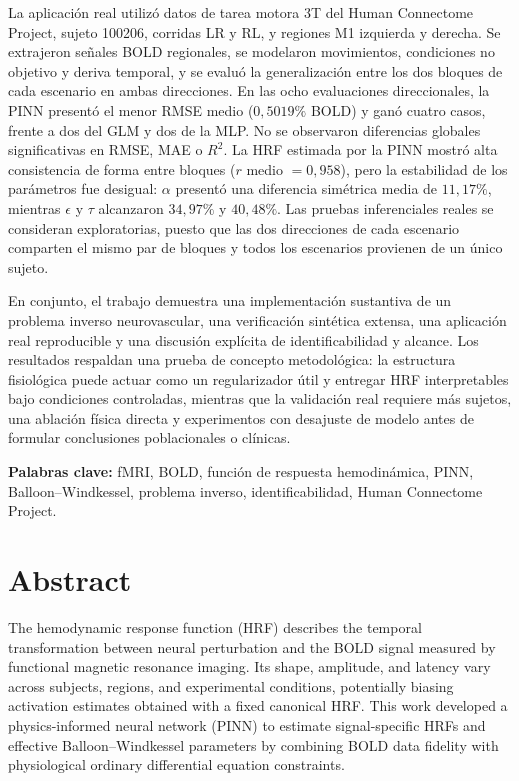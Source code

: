 La aplicación real utilizó datos de tarea motora 3T del Human Connectome Project, sujeto 100206, corridas LR y RL, y regiones M1 izquierda y derecha. Se extrajeron señales BOLD regionales, se modelaron movimientos, condiciones no objetivo y deriva temporal, y se evaluó la generalización entre los dos bloques de cada escenario en ambas direcciones. En las ocho evaluaciones direccionales, la PINN presentó el menor RMSE medio ($0{,}5019\%$ BOLD) y ganó cuatro casos, frente a dos del GLM y dos de la MLP. No se observaron diferencias globales significativas en RMSE, MAE o $R^2$. La HRF estimada por la PINN mostró alta consistencia de forma entre bloques ($r$ medio $=0{,}958$), pero la estabilidad de los parámetros fue desigual: $\alpha$ presentó una diferencia simétrica media de $11{,}17\%$, mientras $\epsilon$ y $\tau$ alcanzaron $34{,}97\%$ y $40{,}48\%$. Las pruebas inferenciales reales se consideran exploratorias, puesto que las dos direcciones de cada escenario comparten el mismo par de bloques y todos los escenarios provienen de un único sujeto.

En conjunto, el trabajo demuestra una implementación sustantiva de un problema inverso neurovascular, una verificación sintética extensa, una aplicación real reproducible y una discusión explícita de identificabilidad y alcance. Los resultados respaldan una prueba de concepto metodológica: la estructura fisiológica puede actuar como un regularizador útil y entregar HRF interpretables bajo condiciones controladas, mientras que la validación real requiere más sujetos, una ablación física directa y experimentos con desajuste de modelo antes de formular conclusiones poblacionales o clínicas.

\textbf{Palabras clave:} fMRI, BOLD, función de respuesta hemodinámica, PINN, Balloon--Windkessel, problema inverso, identificabilidad, Human Connectome Project.

\chapter*{Abstract}

The hemodynamic response function (HRF) describes the temporal transformation between neural perturbation and the BOLD signal measured by functional magnetic resonance imaging. Its shape, amplitude, and latency vary across subjects, regions, and experimental conditions, potentially biasing activation estimates obtained with a fixed canonical HRF. This work developed a physics-informed neural network (PINN) to estimate signal-specific HRFs and effective Balloon--Windkessel parameters by combining BOLD data fidelity with physiological ordinary differential equation constraints.

